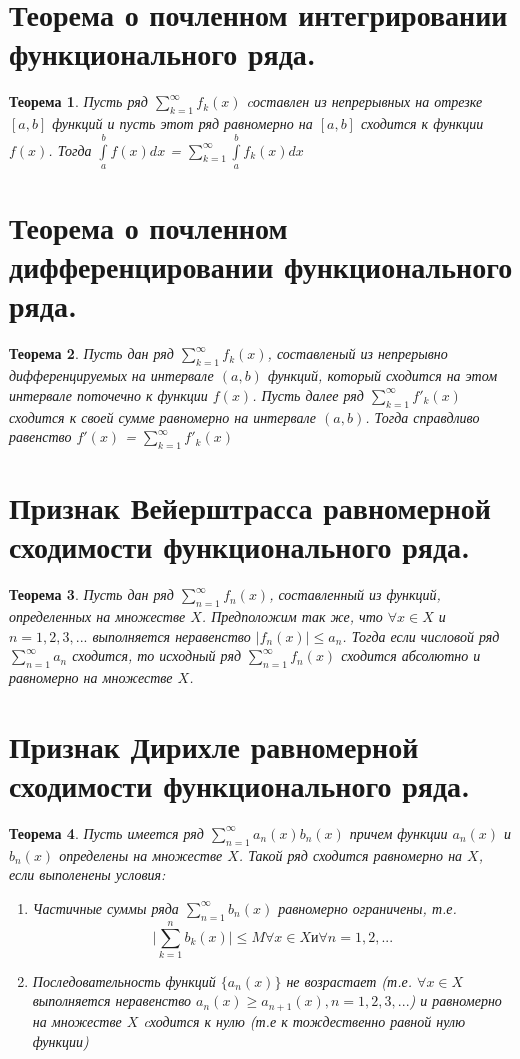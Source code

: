 \documentclass[12pt, a4paper]{article}
\newtheorem{thm}{Теорема}
\begin{document}
\section{Теорема о почленном интегрировании функционального ряда.}
\begin{thm}
Пусть ряд $\sum\limits_{k=1}^{\infty}f_k(x)$ cоставлен из непрерывных на отрезке $[a, b]$ функций и пусть этот ряд равномерно на $[a, b]$ сходится к функции $f(x)$. Тогда $\int\limits_{a}^{b}f(x)dx$ = $\sum\limits_{k=1}^{\infty}\int\limits_{a}^{b}f_k(x)dx$
\end{thm}

\section{Теорема о почленном дифференцировании функционального ряда.}
\begin{thm}
Пусть дан ряд $\sum\limits_{k=1}^{\infty}f_k(x)$, составленый из непрерывно дифференцируемых на интервале $(a, b)$ функций, который сходится на этом интервале поточечно к функции $f(x)$. Пусть далее ряд $\sum\limits_{k=1}^{\infty}f'_k(x)$ сходится к своей сумме равномерно на интервале $(a, b)$. Тогда справдливо равенство $f'(x)$ = $\sum\limits_{k=1}^{\infty}f'_k(x)$
\end{thm}


\section{Признак Вейерштрасса равномерной сходимости функционального ряда.}
\begin{thm}
	Пусть дан ряд $\sum\limits_{n=1}^{\infty}f_n(x)$, составленный из функций, определенных на множестве $X$. Предположим так же, что $\forall x \in X$ и $n = 1, 2, 3, ...$ выполняется неравенство $\mid f_n(x) \mid \leq a_n$. Тогда если числовой ряд $\sum\limits_{n=1}^{\infty}a_n$ сходится, то исходный ряд $\sum\limits_{n=1}^{\infty}f_n(x)$ сходится абсолютно и равномерно на множестве $X$.
\end{thm}

\section{Признак Дирихле равномерной сходимости функционального ряда.}
\begin{thm}
	Пусть имеется ряд $\sum\limits_{n=1}^{\infty}a_n(x)b_n(x)$ причем функции $a_n(x)$ и $b_n(x)$ определены на множестве $X$. Такой ряд сходится равномерно на $X$, если выполенены условия:
	\begin{enumerate}
		\item{Частичные суммы ряда $\sum\limits_{n=1}^{\infty}b_n(x)$ равномерно ограничены, т.е.
		\[
			\mid\sum\limits_{k=1}^{n}b_k(x)\mid \leq M \forall x \in X \text{и} \forall n = 1, 2, ...		
		\] } 
		\item{Последовательность функций $\{a_n(x)\}$ не возрастает (т.е. $\forall x \in X$ выполняется неравенство $a_n(x)  \geq  a_{n+1}(x), n = 1, 2, 3, ...$) и равномерно на множестве $X$ cходится к нулю (т.е к тождественно равной нулю функции)}
	\end{enumerate}
\end{thm}
\end{document}
